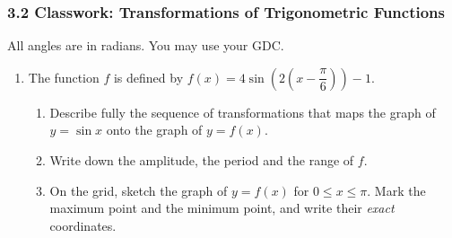\documentclass[12pt, twoside]{article}
\begin{document}
\subsubsection*{3.2 Classwork: Transformations of Trigonometric Functions}

All angles are in radians. You may use your GDC.

\begin{enumerate}[itemsep=0.15cm]

\item[1.]

The function $f$ is defined by
$f(x) = 4\sin\!\left(2\left(x - \dfrac{\pi}{6}\right)\right) - 1$.

\begin{enumerate}[itemsep=0.1cm]
  \item Describe fully the sequence of transformations that maps the graph
  of $y = \sin x$ onto the graph of $y = f(x)$.
  \item Write down the amplitude, the period and the range of $f$.
  \item On the grid, sketch the graph of $y = f(x)$ for $0 \le x \le \pi$.
  Mark the maximum point and the minimum point, and write their
  \emph{exact} coordinates.
\end{enumerate}



\end{enumerate}
\end{document}
